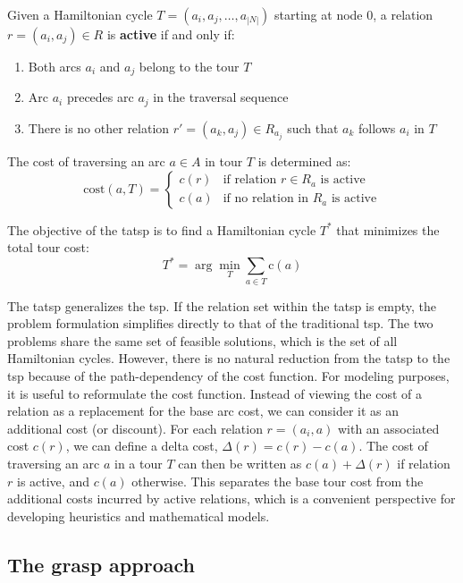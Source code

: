 \documentclass[twocolumn, switch]{article} %
\begin{document}
Given a Hamiltonian cycle $T = (a_i, a_j, \ldots, a_{|N|})$ starting at node $0$, a relation $r = (a_i, a_j) \in R$ is \textbf{active} if and only if:
\begin{enumerate}
\item Both arcs $a_i$ and $a_j$ belong to the tour $T$
\item Arc $a_i$ precedes arc $a_j$ in the traversal sequence
\item There is no other relation $r' = (a_k, a_j) \in R_{a_j}$ such that $a_k$ follows $a_i$ in $T$
\end{enumerate}

The cost of traversing an arc $a \in A$ in tour $T$ is determined as:
\begin{equation}
\text{cost}(a, T) = \begin{cases}
c(r) & \text{if relation } r \in R_a \text{ is active} \\
c(a) & \text{if no relation in } R_a \text{ is active}
\end{cases}
\end{equation}

The objective of the \gls{tatsp} is to find a Hamiltonian cycle $T^*$ that minimizes the total tour cost:
\begin{equation}
T^* = \arg\min_{T} \sum_{a \in T} \text{c}(a)
\end{equation}

The \gls{tatsp} generalizes the \gls{tsp}. If the relation set within the \gls{tatsp} is empty, 
the problem formulation simplifies directly to that of the traditional \gls{tsp}.
The two problems share the same set of feasible solutions, which is the set of all Hamiltonian cycles.
However, there is no natural reduction from the \gls{tatsp} to the \gls{tsp} because of the path-dependency of the cost function.
For modeling purposes, it is useful to reformulate the cost function. Instead of viewing the cost of a relation as a replacement for the base arc cost, we can consider it as an additional cost (or discount). For each relation $r = (a_i, a)$ with an associated cost $c(r)$, we can define a delta cost, $\Delta(r) = c(r) - c(a)$. The cost of traversing an arc $a$ in a tour $T$ can then be written as $c(a) + \Delta(r)$ if relation $r$ is active, and $c(a)$ otherwise. This separates the base tour cost from the additional costs incurred by active relations, which is a convenient perspective for developing heuristics and mathematical models.

\subsection{The \gls{grasp} approach}
\end{document}
